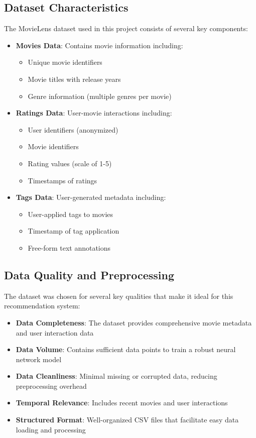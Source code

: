 \documentclass[12pt]{article}
\begin{document}
\subsection{Dataset Characteristics}
The MovieLens dataset used in this project consists of several key components:
\begin{itemize}
    \item \textbf{Movies Data}: Contains movie information including:
    \begin{itemize}
        \item Unique movie identifiers
        \item Movie titles with release years
        \item Genre information (multiple genres per movie)
    \end{itemize}
    \item \textbf{Ratings Data}: User-movie interactions including:
    \begin{itemize}
        \item User identifiers (anonymized)
        \item Movie identifiers
        \item Rating values (scale of 1-5)
        \item Timestamps of ratings
    \end{itemize}
    \item \textbf{Tags Data}: User-generated metadata including:
    \begin{itemize}
        \item User-applied tags to movies
        \item Timestamp of tag application
        \item Free-form text annotations
    \end{itemize}
\end{itemize}

\subsection{Data Quality and Preprocessing}
The dataset was chosen for several key qualities that make it ideal for this recommendation system:
\begin{itemize}
    \item \textbf{Data Completeness}: The dataset provides comprehensive movie metadata and user interaction data
    \item \textbf{Data Volume}: Contains sufficient data points to train a robust neural network model
    \item \textbf{Data Cleanliness}: Minimal missing or corrupted data, reducing preprocessing overhead
    \item \textbf{Temporal Relevance}: Includes recent movies and user interactions
    \item \textbf{Structured Format}: Well-organized CSV files that facilitate easy data loading and processing
\end{itemize}
\end{document}
